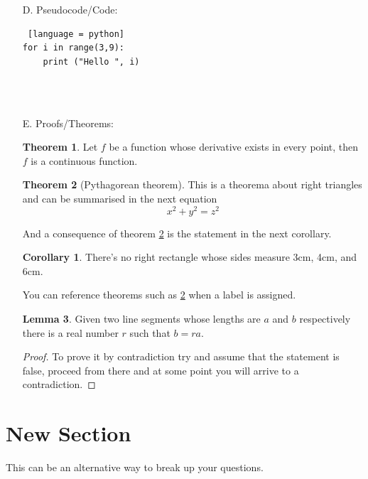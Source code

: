 \documentclass[11pt]{article}
\theoremstyle{definition}
\newtheorem{theorem}{Theorem}[section]
\newtheorem{corollary}{Corollary}[theorem]
\newtheorem{lemma}[theorem]{Lemma}
\begin{document}
\begin{enumerate}
\begin{enumerate}
         $
    \end{enumerate}
    
\item [D.] Pseudocode/Code: \\

\begin{lstlisting} [language = python]
for i in range(3,9):
    print ("Hello ", i)
    
\end{lstlisting}
\\

\item[E.] Proofs/Theorems: \\
\begin{theorem}
Let $f$ be a function whose derivative exists in every point, then $f$ is 
a continuous function.
\end{theorem}
 
\begin{theorem}[Pythagorean theorem]
\label{pythagorean}
This is a theorema about right triangles and can be summarised in the next 
equation 
\[ x^2 + y^2 = z^2 \]
\end{theorem}
 
And a consequence of theorem \ref{pythagorean} is the statement in the next 
corollary.
 
\begin{corollary}
There's no right rectangle whose sides measure 3cm, 4cm, and 6cm.
\end{corollary}
 
You can reference theorems such as \ref{pythagorean} when a label is assigned.
 
\begin{lemma}
Given two line segments whose lengths are $a$ and $b$ respectively there is a 
real number $r$ such that $b=ra$.
\end{lemma}

\begin{proof}
To prove it by contradiction try and assume that the statement is false,
proceed from there and at some point you will arrive to a contradiction.
\end{proof}

\end{enumerate}


\noindent\hrulefill %

\section*{New Section}

This can be an alternative way to break up your questions.
\end{document}
